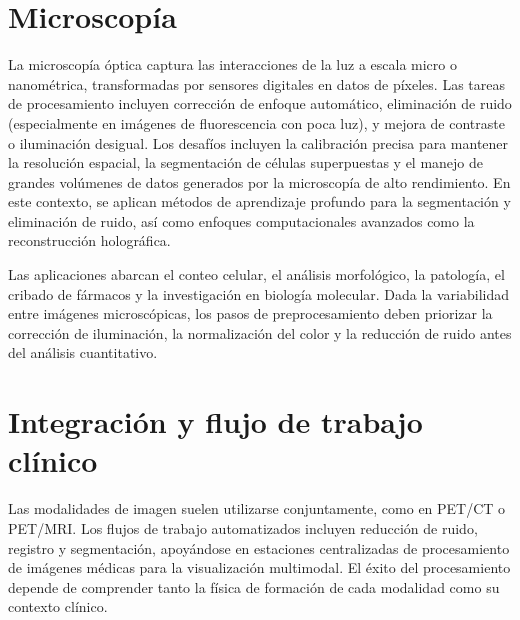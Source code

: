 \section{Microscopía}

La microscopía óptica captura las interacciones de la luz a escala micro o nanométrica, transformadas por sensores digitales en datos de píxeles. Las tareas de procesamiento incluyen corrección de enfoque automático, eliminación de ruido (especialmente en imágenes de fluorescencia con poca luz), y mejora de contraste o iluminación desigual. Los desafíos incluyen la calibración precisa para mantener la resolución espacial, la segmentación de células superpuestas y el manejo de grandes volúmenes de datos generados por la microscopía de alto rendimiento. En este contexto, se aplican métodos de aprendizaje profundo para la segmentación y eliminación de ruido, así como enfoques computacionales avanzados como la reconstrucción holográfica.

Las aplicaciones abarcan el conteo celular, el análisis morfológico, la patología, el cribado de fármacos y la investigación en biología molecular. Dada la variabilidad entre imágenes microscópicas, los pasos de preprocesamiento deben priorizar la corrección de iluminación, la normalización del color y la reducción de ruido antes del análisis cuantitativo.

\section{Integración y flujo de trabajo clínico}

Las modalidades de imagen suelen utilizarse conjuntamente, como en PET/CT o PET/MRI. Los flujos de trabajo automatizados incluyen reducción de ruido, registro y segmentación, apoyándose en estaciones centralizadas de procesamiento de imágenes médicas para la visualización multimodal. El éxito del procesamiento depende de comprender tanto la física de formación de cada modalidad como su contexto clínico.

